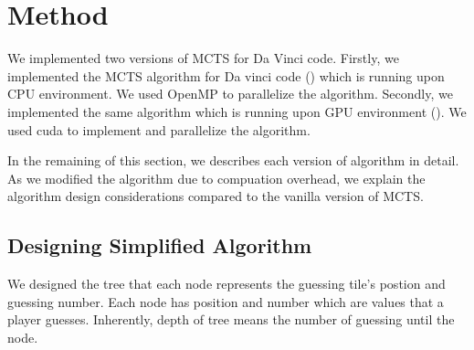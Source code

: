 
\section{Method}
We implemented two versions of MCTS for Da Vinci code. 
Firstly, we implemented the MCTS algorithm for Da vinci code (\cpu) which is running upon CPU environment.
We used OpenMP to parallelize the algorithm.
Secondly, we implemented the same algorithm which is running upon GPU environment (\gpu).
We used cuda to implement and parallelize the algorithm.

In the remaining of this section, we describes each version of algorithm in detail. 
As we modified the algorithm due to compuation overhead, we explain the algorithm design considerations compared to the vanilla version of MCTS.

\subsection{Designing Simplified Algorithm}


We designed the tree that each node represents the guessing tile's postion and guessing number.
Each node has position and number which are values that a player guesses.
Inherently, depth of tree means the number of guessing until the node.


